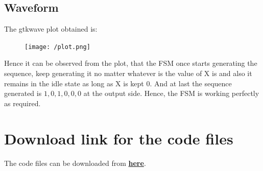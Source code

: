 \documentclass[a4paper]{article}
\begin{document}
\subsection{Waveform}
The gtkwave plot obtained is:
\begin{figure}[H]
  \centering
  \texttt{[image: /plot.png]}
\end{figure}
Hence it can be observed from the plot, that the FSM once starts generating the sequence, keep generating it no matter whatever is the value of X is and also it remains in the idle state as long as X is kept 0. And at last the sequence generated is $1,0,1,0,0,0$ at the output side. Hence, the FSM is working perfectly as required.
\section*{Download link for the code files}
The code files can be downloaded from \href{https://drive.google.com/file/d/154Ns-3BjkBaJXzXriUoTww2TzG_f4Ziu/view?usp=sharing}{\textbf{here}}.
\end{document}
